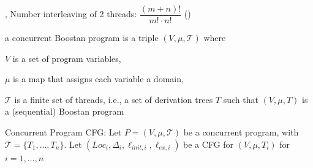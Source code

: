 \documentclass[landscape, a4paper]{article}
\begin{document}
\begin{minipage}[t]{0.2\linewidth}
	\begin{betterlist}
		\item {}, Number interleaving of 2 threads: $\dfrac{(m+n)!}{m!\cdot n!} $ ()
		\item \color{orange}a \alert{ concurrent Boostan program}  is a triple $(V , \mu , \mathcal{T})$ where
		\begin{betterlist}
			\item $V$ is a set of program variables,
			\item $\mu$ is a map that assigns each variable a domain,
			\item $\mathcal{T}$ is a finite set of threads, i.e., a set of derivation trees $T$ such that $(V , \mu , T)$ is a (sequential) Boostan program
		\end{betterlist}\color{black}
		\item \color{orange}\alert{Concurrent Program CFG:} Let $P = (V , \mu , \mathcal{T} )$ be a concurrent program, with $\mathcal{T} = \{ T_1,\ldots, T_n\}$. Let $(Loc_i, \Delta_i, \ell_{init,i}, \ell_{ex,i})$ be a CFG for $(V, \mu , T_i)$ for $i = 1, \ldots, n$


\end{betterlist}
\end{minipage}
\end{document}
